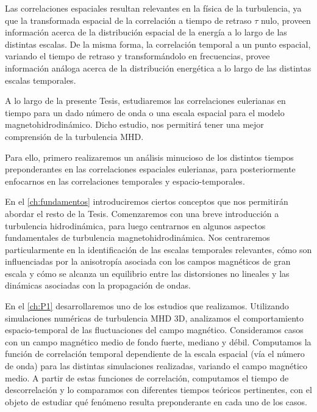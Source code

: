 Las correlaciones espaciales resultan relevantes en la física de la
turbulencia, ya que la transformada espacial de la correlación a
tiempo de retraso $\tau$ nulo, proveen información acerca de la
distribución espacial de la energía a lo largo de las distintas
escalas. De la misma forma, la correlación temporal a un punto
espacial, variando el tiempo de retraso y transformándolo en
frecuencias, provee información análoga acerca de la distribución
energética a lo largo de las distintas escalas temporales.

A lo largo de la presente Tesis, estudiaremos las correlaciones
eulerianas en tiempo para un dado número de onda o una escala espacial
para el modelo magnetohidrodinámico. Dicho estudio, nos permitirá
tener una mejor comprensión de la turbulencia MHD.

Para ello, primero realizaremos un análisis minucioso de los distintos
tiempos preponderantes en las correlaciones espaciales eulerianas,
para posteriormente enfocarnos en las correlaciones temporales y
espacio-temporales.



\vspace{3cm}

En el \cref{ch:fundamentos} introduciremos ciertos conceptos que nos
permitirán abordar el resto de la Tesis. Comenzaremos con una breve
introducción a turbulencia hidrodinámica, para luego centrarnos en
algunos aspectos fundamentales de turbulencia
magnetohidrodinámica. Nos centraremos particularmente en la
identificación de las escalas temporales relevantes, cómo son
influenciadas por la anisotropía asociada con los campos magnéticos de
gran escala y cómo se alcanza un equilibrio entre las distorsiones no
lineales y las dinámicas asociadas con la propagación de ondas.

En el \cref{ch:P1} desarrollaremos uno de los estudios que realizamos.
Utilizando simulaciones numéricas de turbulencia MHD 3D, analizamos el
comportamiento espacio-temporal de las fluctuaciones del campo
magnético. Consideramos casos con un campo magnético medio de fondo
fuerte, mediano y débil. Computamos la función de correlación temporal
dependiente de la escala espacial (vía el número de onda) para las
distintas simulaciones realizadas, variando el campo magnético
medio. A partir de estas funciones de correlación, computamos el
tiempo de descorrelación y lo comparamos con diferentes tiempos
teóricos pertinentes, con el objeto de estudiar qué fenómeno resulta
preponderante en cada uno de los casos.


